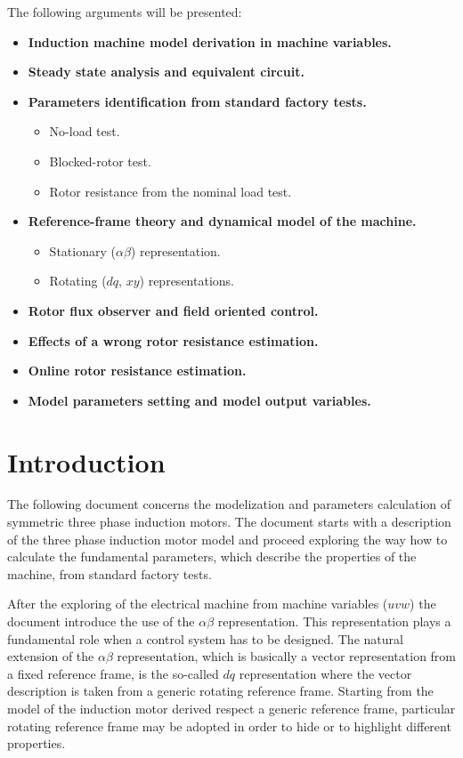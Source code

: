 \documentclass[12pt,a4paper]{scrartcl}
\begin{document}
\begin{onehalfspace}

\noindent The following arguments will be presented:
\begin{itemize}
	\item[$-$] \textbf{Induction machine model derivation in machine variables.}
	\item[$-$] \textbf{Steady state analysis and equivalent circuit.}
	\item[$-$] \textbf{Parameters identification from standard factory tests.}
	\begin{itemize}
		\item[$-$] No-load test.
		\item[$-$] Blocked-rotor test.
		\item[$-$] Rotor resistance from the nominal load test.
	\end{itemize}
	\item[$-$] \textbf{Reference-frame theory and dynamical model of the machine.}
	\begin{itemize}
		\item[$-$] Stationary ($\alpha\beta$) representation.
		\item[$-$] Rotating ($dq$, $xy$) representations.
	\end{itemize}
	\item[$-$] \textbf{Rotor flux observer and field oriented control.}
	\item[$-$] \textbf{Effects of a wrong rotor resistance estimation.}
	\item[$-$] \textbf{Online rotor resistance estimation.}
	\item[$-$] \textbf{Model parameters setting and model output variables.}
\end{itemize}

\section{Introduction}
The following document concerns the modelization and parameters calculation of symmetric three phase induction motors. The document starts with a description of the three phase induction motor model and proceed exploring the way how to calculate the fundamental parameters, which describe the properties of the machine, from standard factory tests.

After the exploring of the electrical machine from machine variables ($uvw$) the document introduce the use of the $\alpha\beta$ representation. This representation plays a fundamental role when a control system has to be designed. The natural extension of the $\alpha\beta$ representation, which is basically a vector representation from a fixed reference frame, is the so-called $dq$ representation where the vector description is taken from a generic rotating reference frame.  Starting from the model of the induction motor derived respect a generic reference frame, particular rotating reference frame may be adopted in order to hide or to highlight different properties.


\end{onehalfspace}
\end{document}
